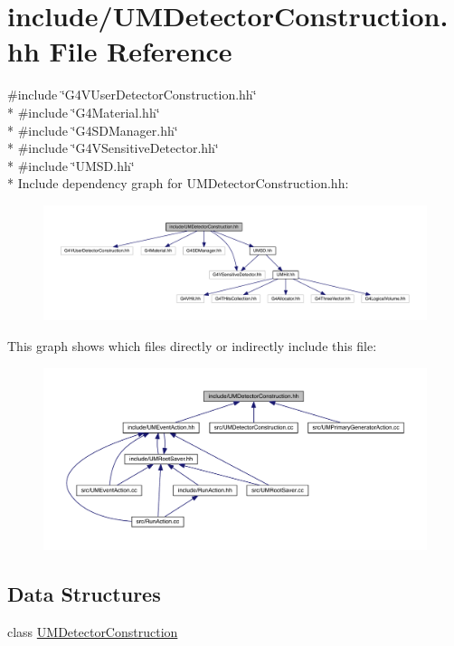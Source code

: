 \hypertarget{UMDetectorConstruction_8hh}{}\section{include/\+U\+M\+Detector\+Construction.hh File Reference}
\label{UMDetectorConstruction_8hh}
{\ttfamily \#include \char`\"{}G4\+V\+User\+Detector\+Construction.\+hh\char`\"{}}\\*
{\ttfamily \#include \char`\"{}G4\+Material.\+hh\char`\"{}}\\*
{\ttfamily \#include \char`\"{}G4\+S\+D\+Manager.\+hh\char`\"{}}\\*
{\ttfamily \#include \char`\"{}G4\+V\+Sensitive\+Detector.\+hh\char`\"{}}\\*
{\ttfamily \#include \char`\"{}U\+M\+S\+D.\+hh\char`\"{}}\\*
Include dependency graph for U\+M\+Detector\+Construction.\+hh\+:
\nopagebreak
\begin{figure}[H]
\begin{center}
\leavevmode
\includegraphics[width=350pt]{UMDetectorConstruction_8hh__incl}
\end{center}
\end{figure}
This graph shows which files directly or indirectly include this file\+:
\nopagebreak
\begin{figure}[H]
\begin{center}
\leavevmode
\includegraphics[width=350pt]{UMDetectorConstruction_8hh__dep__incl}
\end{center}
\end{figure}
\subsection*{Data Structures}
\begin{DoxyCompactItemize}
\item 
class \hyperlink{classUMDetectorConstruction}{U\+M\+Detector\+Construction}
\end{DoxyCompactItemize}
